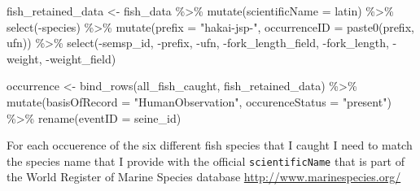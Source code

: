 \documentclass[
]{book}
\newenvironment{Shaded}{\begin{snugshade}}{\end{snugshade}}
\newcommand{\AttributeTok}[1]{\textcolor[rgb]{0.77,0.63,0.00}{#1}}
\newcommand{\FunctionTok}[1]{\textcolor[rgb]{0.00,0.00,0.00}{#1}}
\newcommand{\NormalTok}[1]{#1}
\newcommand{\OtherTok}[1]{\textcolor[rgb]{0.56,0.35,0.01}{#1}}
\newcommand{\SpecialCharTok}[1]{\textcolor[rgb]{0.00,0.00,0.00}{#1}}
\newcommand{\StringTok}[1]{\textcolor[rgb]{0.31,0.60,0.02}{#1}}
\begin{document}
\begin{Shaded}
\begin{Highlighting}[]
\NormalTok{fish\_retained\_data }\OtherTok{\textless{}{-}}\NormalTok{ fish\_data }\SpecialCharTok{\%\textgreater{}\%} 
  \FunctionTok{mutate}\NormalTok{(}\AttributeTok{scientificName =}\NormalTok{ latin) }\SpecialCharTok{\%\textgreater{}\%} 
  \FunctionTok{select}\NormalTok{(}\SpecialCharTok{{-}}\NormalTok{species) }\SpecialCharTok{\%\textgreater{}\%} 
  \FunctionTok{mutate}\NormalTok{(}\AttributeTok{prefix =} \StringTok{"hakai{-}jsp{-}"}\NormalTok{,}
         \AttributeTok{occurrenceID =} \FunctionTok{paste0}\NormalTok{(prefix, ufn)) }\SpecialCharTok{\%\textgreater{}\%} 
  \FunctionTok{select}\NormalTok{(}\SpecialCharTok{{-}}\NormalTok{semsp\_id, }\SpecialCharTok{{-}}\NormalTok{prefix, }\SpecialCharTok{{-}}\NormalTok{ufn, }\SpecialCharTok{{-}}\NormalTok{fork\_length\_field, }\SpecialCharTok{{-}}\NormalTok{fork\_length, }\SpecialCharTok{{-}}\NormalTok{weight, }\SpecialCharTok{{-}}\NormalTok{weight\_field)}

\NormalTok{occurrence }\OtherTok{\textless{}{-}} \FunctionTok{bind\_rows}\NormalTok{(all\_fish\_caught, fish\_retained\_data) }\SpecialCharTok{\%\textgreater{}\%} 
  \FunctionTok{mutate}\NormalTok{(}\AttributeTok{basisOfRecord =} \StringTok{"HumanObservation"}\NormalTok{,}
        \AttributeTok{occurenceStatus =} \StringTok{"present"}\NormalTok{) }\SpecialCharTok{\%\textgreater{}\%} 
  \FunctionTok{rename}\NormalTok{(}\AttributeTok{eventID =}\NormalTok{ seine\_id)}
\end{Highlighting}
\end{Shaded}

For each occuerence of the six different fish species that I caught I need to match the species name that I provide with the official \texttt{scientificName} that is part of the World Register of Marine Species database \url{http://www.marinespecies.org/}
\end{document}
